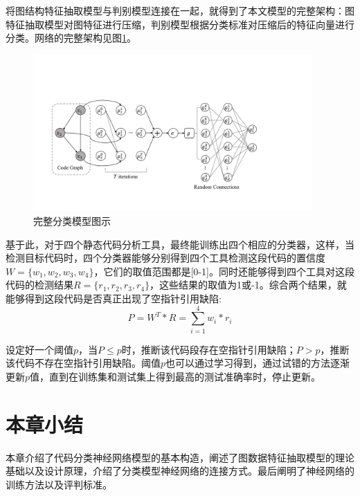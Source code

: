 将图结构特征抽取模型与判别模型连接在一起，就得到了本文模型的完整架构：图特征抽取模型对图特征进行压缩，判别模型根据分类标准对压缩后的特征向量进行分类。网络的完整架构见图\ref{fig:c_mod}。
\begin{figure}[htbp]
	\begin{center}
		\includegraphics[width=0.95\textwidth]{figures//6.pdf}
		\caption{完整分类模型图示}
		\label{fig:c_mod}
	\end{center}
\end{figure}
\par 基于此，对于四个静态代码分析工具，最终能训练出四个相应的分类器，这样，当检测目标代码时，四个分类器能够分别得到四个工具检测这段代码的置信度$W = \{w_1, w_2, w_3, w_4\}$，它们的取值范围都是[0-1]。同时还能够得到四个工具对这段代码的检测结果$R = \{r_1, r_2, r_3, r_4\}$，这些结果的取值为1或-1。综合两个结果，就能够得到这段代码是否真正出现了空指针引用缺陷:
$$P = W^T*R = \sum_{i=1}^4 w_i*r_i$$
\par 设定好一个阈值$p$，当$P\le p$时，推断该代码段存在空指针引用缺陷；$P>p$，推断该代码不存在空指针引用缺陷。阈值$p$也可以通过学习得到，通过试错的方法逐渐更新$p$值，直到在训练集和测试集上得到最高的测试准确率时，停止更新。
\section{本章小结}
本章介绍了代码分类神经网络模型的基本构造，阐述了图数据特征抽取模型的理论基础以及设计原理，介绍了分类模型神经网络的连接方式。最后阐明了神经网络的训练方法以及评判标准。
